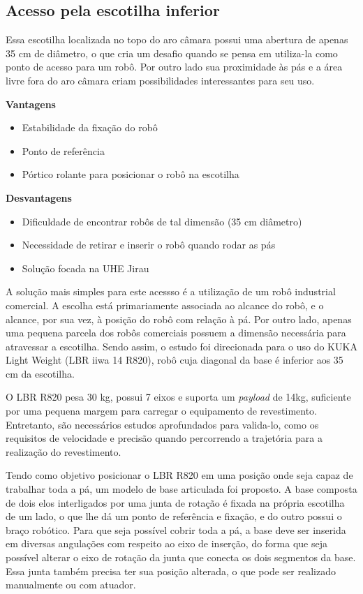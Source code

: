 \subsection{Acesso pela escotilha inferior}

Essa escotilha localizada no topo do aro câmara possui uma abertura de apenas
35 cm de diâmetro, o que cria um desafio quando se pensa em utiliza-la como
ponto de acesso para um robô. Por outro lado sua proximidade às pás e a área livre fora do aro
câmara criam possibilidades interessantes para seu uso.

\textbf{Vantagens}
\begin{itemize}
  \item Estabilidade da fixação do robô
  \item Ponto de referência
  \item Pórtico rolante para posicionar o robô na escotilha
\end{itemize}

\textbf{Desvantagens}
\begin{itemize}
  \item Dificuldade de encontrar robôs de tal dimensão (35 cm diâmetro)
  \item Necessidade de retirar e inserir o robô quando rodar as pás
  \item Solução focada na UHE Jirau
\end{itemize}

A solução mais simples para este acessso é a utilização de um robô industrial
comercial. A escolha está primariamente associada ao alcance do robô, e o
alcance, por sua vez, à posição do robô com relação à pá. Por outro lado, apenas
uma pequena parcela dos robôs comerciais possuem a dimensão necessária para
atravessar a escotilha. Sendo assim, o estudo foi direcionada para o uso do
KUKA Light Weight (LBR iiwa 14 R820), robô cuja diagonal da base é inferior aos
35 cm da escotilha.

O LBR R820 pesa 30 kg, possui 7 eixos e suporta um \textit{payload} de 14kg,
suficiente por uma pequena margem para carregar o equipamento de
revestimento. Entretanto, são necessários estudos aprofundados para valida-lo,
como os requisitos de velocidade e precisão quando percorrendo a trajetória
para a realização do revestimento.

Tendo como objetivo posicionar o LBR R820 em uma posição onde seja capaz de
trabalhar toda a pá, um modelo de base articulada foi proposto. A base
composta de dois elos interligados por uma junta de rotação é fixada na
própria escotilha de um lado, o que lhe dá um ponto de referência e fixação, e
do outro possui o braço robótico. Para que seja possível cobrir toda a pá,
a base deve ser inserida em diversas angulações com respeito ao
eixo de inserção, do forma que seja possível alterar o eixo de rotação da junta
que conecta os dois segmentos da base. Essa junta também precisa ter sua posição
alterada, o que pode ser realizado manualmente ou com atuador.

